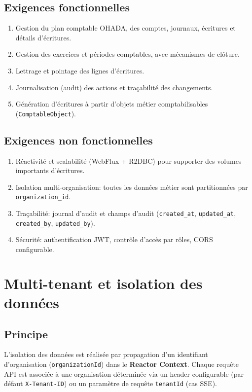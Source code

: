 \documentclass[12pt,a4paper]{report}
\begin{document}
\section{Exigences fonctionnelles}
\begin{enumerate}[label=\textbf{RF-\arabic*.}]
  \item Gestion du plan comptable OHADA, des comptes, journaux, écritures et détails d'écritures.
  \item Gestion des exercices et périodes comptables, avec mécanismes de clôture.
  \item Lettrage et pointage des lignes d'écritures.
  \item Journalisation (audit) des actions et traçabilité des changements.
  \item Génération d'écritures à partir d'objets métier comptabilisables (\texttt{ComptableObject}).
\end{enumerate}

\section{Exigences non fonctionnelles}
\begin{enumerate}[label=\textbf{RNF-\arabic*.}]
  \item Réactivité et scalabilité (WebFlux + R2DBC) pour supporter des volumes importants d'écritures.
  \item Isolation multi-organisation: toutes les données métier sont partitionnées par \texttt{organization\_id}.
  \item Traçabilité: journal d'audit et champs d'audit (\texttt{created\_at}, \texttt{updated\_at}, \texttt{created\_by}, \texttt{updated\_by}).
  \item Sécurité: authentification JWT, contrôle d'accès par rôles, CORS configurable.
\end{enumerate}

\chapter{Multi-tenant et isolation des données}
\section{Principe}
L'isolation des données est réalisée par propagation d'un identifiant d'organisation (\texttt{organizationId}) dans le \textbf{Reactor Context}.
Chaque requête API est associée à une organisation déterminée via un header configurable (par défaut \texttt{X-Tenant-ID}) ou un paramètre de requête \texttt{tenantId} (cas SSE).
\end{document}
